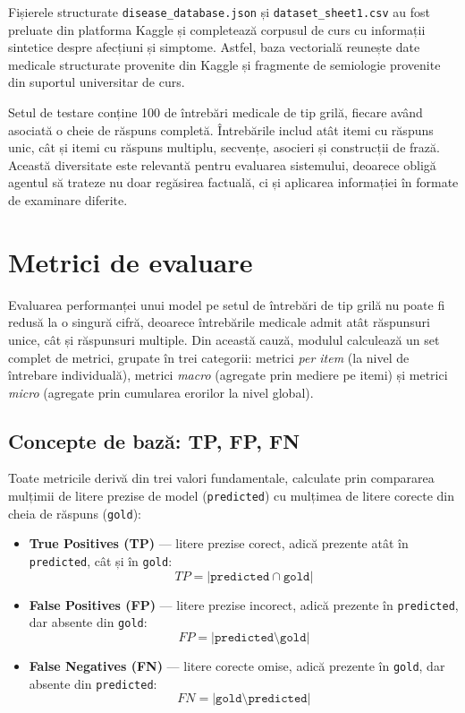 \documentclass[12pt, a4paper, oneside, romanian]{teza-upb}
\begin{document}
Fișierele structurate \texttt{disease\_database.json} și \texttt{dataset\_sheet1.csv} au fost preluate din platforma Kaggle și completează corpusul de curs cu informații sintetice despre afecțiuni și simptome. Astfel, baza vectorială reunește date medicale structurate provenite din Kaggle și fragmente de semiologie provenite din suportul universitar de curs.

Setul de testare conține 100 de întrebări medicale de tip grilă, fiecare având asociată o cheie de răspuns completă. Întrebările includ atât itemi cu răspuns unic, cât și itemi cu răspuns multiplu, secvențe, asocieri și construcții de frază. Această diversitate este relevantă pentru evaluarea sistemului, deoarece obligă agentul să trateze nu doar regăsirea factuală, ci și aplicarea informației în formate de examinare diferite.

\section{Metrici de evaluare}

Evaluarea performanței unui model pe setul de întrebări de tip grilă nu poate fi redusă la o singură cifră, deoarece întrebările medicale admit atât răspunsuri unice, cât și răspunsuri multiple. Din această cauză, modulul calculează un set complet de metrici, grupate în trei categorii: metrici \textit{per item} (la nivel de întrebare individuală), metrici \textit{macro} (agregate prin mediere pe itemi) și metrici \textit{micro} (agregate prin cumularea erorilor la nivel global).

\subsection{Concepte de bază: TP, FP, FN}

Toate metricile derivă din trei valori fundamentale, calculate prin compararea mulțimii de litere prezise de model (\texttt{predicted}) cu mulțimea de litere corecte din cheia de răspuns (\texttt{gold}):

\begin{itemize}
    \item \textbf{True Positives (TP)} --- litere prezise corect, adică prezente atât în \texttt{predicted}, cât și în \texttt{gold}:
    \[ TP = |\texttt{predicted} \cap \texttt{gold}| \]

    \item \textbf{False Positives (FP)} --- litere prezise incorect, adică prezente în \texttt{predicted}, dar absente din \texttt{gold}:
    \[ FP = |\texttt{predicted} \setminus \texttt{gold}| \]

    \item \textbf{False Negatives (FN)} --- litere corecte omise, adică prezente în \texttt{gold}, dar absente din \texttt{predicted}:
    \[ FN = |\texttt{gold} \setminus \texttt{predicted}| \]
\end{itemize}
\end{document}
